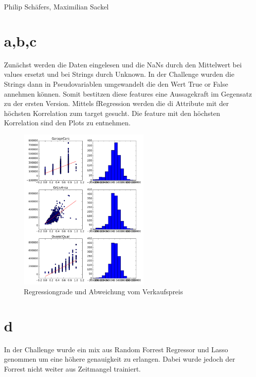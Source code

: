 Philip Schäfers, Maximilian Sackel
\section*{a,b,c}
Zunächst werden die Daten eingelesen und die NaNs durch den Mittelwert bei values ersetzt und bei Strings durch Unknown. In der Challenge wurden die Strings dann in Pseudovariablen umgewandelt die den Wert True or False annehmen können. Somit bestitzen diese features eine Aussagekraft im Gegensatz zu der ersten Version.
Mittels fRegression werden die di Attribute mit der höchsten Korrelation zum target gesucht. Die feature mit den höchsten Korrelation sind den Plots zu entnehmen.
\begin{figure}
  \centering
  \includegraphics[height=8cm]{./Python/bundc.pdf}
  \caption{Regressiongrade und Abweichung vom Verkaufspreis}
\end{figure}
\section*{d}
In der Challenge wurde ein mix aus Random Forrest Regressor und Lasso genommen um eine höhere genauigkeit zu erlangen. Dabei wurde jedoch der Forrest nicht weiter aus Zeitmangel trainiert.
